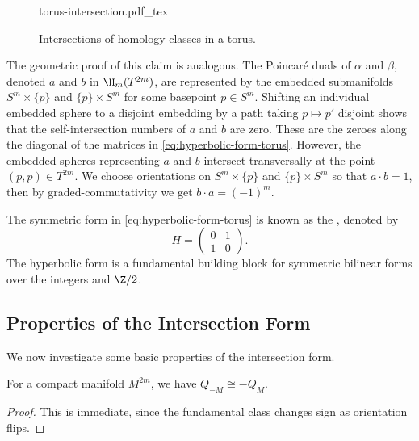 \begin{figure}[ht]
	\centering
	{torus-intersection.pdf_tex}
	\caption{Intersections of homology classes in a torus.}\label{fig:geometric-intersection-torus}
\end{figure}

The geometric proof of this claim is analogous. The Poincar\'e duals of $\alpha$ and $\beta$, denoted $a$ and $b$ in $\H_{m}(T^{2m})$, are represented
by the embedded submanifolds $S^m\times \{p\}$ and $\{p\}\times S^m$ for some basepoint $p\in S^m$. Shifting an individual embedded sphere to a disjoint embedding by a path taking $p\mapsto p'$ disjoint shows that the self-intersection numbers of $a$ and $b$ are zero. These are the zeroes along the diagonal of the matrices in \cref{eq:hyperbolic-form-torus}. However, the embedded spheres representing $a$ and $b$ intersect transversally at the point $(p,p)\in T^{2m}$. We choose orientations on $S^m\times \{p\}$ and $\{p\}\times S^m$ so that $a\cdot b=1$, then by graded-commutativity we get $b\cdot a=(-1)^m$.

\begin{remark}
	The symmetric form in \cref{eq:hyperbolic-form-torus} is known as the , denoted by
	\[
		H=\begin{pmatrix} 0 & 1\\ 1 & 0 \end{pmatrix}.
	\]
	The hyperbolic form is a fundamental building block for symmetric bilinear forms over the integers and $\Z/2$.
\end{remark}

\subsection{Properties of the Intersection Form}
We now investigate some basic properties of the intersection form.

\begin{proposition}\label{prop:orientation-intersection-form}
	For a compact manifold $M^{2m}$, we have
	$Q_{-M} \cong -Q_{M}$.
\end{proposition}
\begin{proof}
	This is immediate, since the fundamental class changes sign as orientation flips.
\end{proof}

